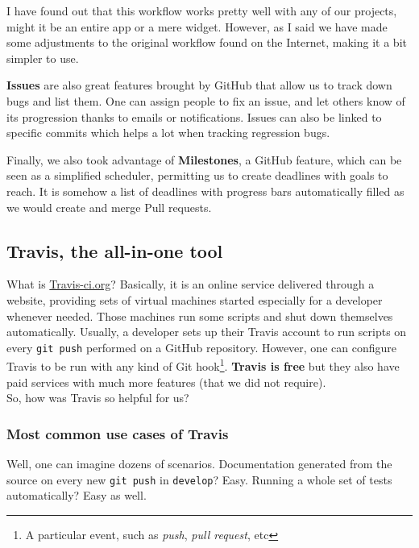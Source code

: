 I have found out that this workflow works pretty well with any of our projects, might it be an entire app or a mere widget. However, as I said we have made some adjustments to the original workflow found on the Internet, making it a bit simpler to use.

\medskip

\textbf{Issues} are also great features brought by GitHub that allow us to track down bugs and list them. One can assign people to fix an issue, and let others know of its progression thanks to emails or notifications. Issues can also be linked to specific commits which helps a lot when tracking regression bugs.

\medskip

Finally, we also took advantage of \textbf{Milestones}, a GitHub feature, which can be seen as a simplified scheduler, permitting us to create deadlines with goals to reach. It is somehow a list of deadlines with progress bars automatically filled as we would create and merge Pull requests.

\subsection{Travis, the all-in-one tool}

What is \href{https://travis-ci.com/}{Travis-ci.org}? Basically, it is an online service delivered through a website, providing sets of virtual machines started especially for a developer whenever needed. Those machines run some scripts and shut down themselves automatically. Usually, a developer sets up their Travis account to run scripts on every \lstinline{git push} performed on a GitHub repository. However, one can configure Travis to be run with any kind of Git hook\footnote{A particular event, such as \textit{push}, \textit{pull request}, etc}. \textbf{Travis is free} but they also have paid services with much more features (that we did not require).\\
So, how was Travis so helpful for us?

\subsubsection{Most common use cases of Travis}

Well, one can imagine dozens of scenarios. Documentation generated from the source on every new \lstinline{git push} in \lstinline{develop}? Easy. Running a whole set of tests automatically? Easy as well.

